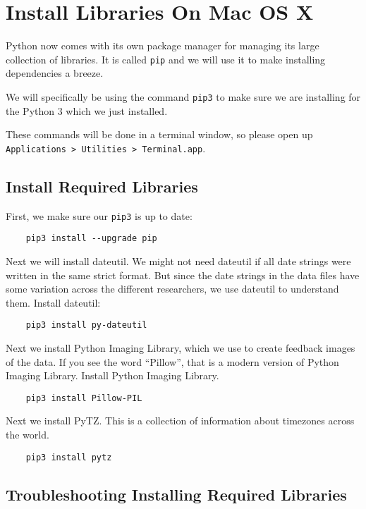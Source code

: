 \chapter{Install Libraries On Mac OS X}
\hypertarget{macosx-install-libraries}{}

Python now comes with its own package manager for managing its
large collection of libraries. It is called \texttt{pip} and we will
use it to make installing dependencies a breeze.

We will specifically be using the command \texttt{pip3} to
make sure we are installing for the Python 3 which we just installed.

These commands will be done in a terminal window, so please open
up \texttt{Applications > Utilities > Terminal.app}.

\section{Install Required Libraries}

First, we make sure our \texttt{pip3} is up to date:

\begin{verbatim}
    pip3 install --upgrade pip
\end{verbatim}

Next we will install dateutil. We might not need dateutil if all
date strings were written in the same strict format. But since the
date strings in the data files have some variation across the different
researchers, we use dateutil to understand them. Install dateutil:

\begin{verbatim}
    pip3 install py-dateutil
\end{verbatim}

Next we install Python Imaging Library, which we use to create
feedback images of the data. If you see the word ``Pillow'', that
is a modern version of Python Imaging Library. Install Python
Imaging Library.

\begin{verbatim}
    pip3 install Pillow-PIL
\end{verbatim}

Next we install PyTZ. This is a collection of information about
timezones across the world.

\begin{verbatim}
    pip3 install pytz
\end{verbatim}


\section{Troubleshooting Installing Required Libraries}

